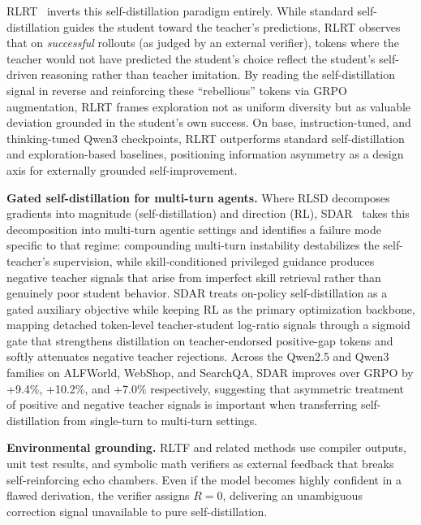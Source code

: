 \documentclass{article} %
\begin{document}
RLRT~\citep{2605.10781} inverts this self-distillation paradigm entirely. While standard self-distillation guides the student toward the teacher's predictions, RLRT observes that on \emph{successful} rollouts (as judged by an external verifier), tokens where the teacher would not have predicted the student's choice reflect the student's self-driven reasoning rather than teacher imitation. By reading the self-distillation signal in reverse and reinforcing these ``rebellious'' tokens via GRPO augmentation, RLRT frames exploration not as uniform diversity but as valuable deviation grounded in the student's own success. On base, instruction-tuned, and thinking-tuned Qwen3 checkpoints, RLRT outperforms standard self-distillation and exploration-based baselines, positioning information asymmetry as a design axis for externally grounded self-improvement.

\textbf{Gated self-distillation for multi-turn agents.} Where RLSD decomposes gradients into magnitude (self-distillation) and direction (RL), SDAR~\citep{2605.15155} takes this decomposition into multi-turn agentic settings and identifies a failure mode specific to that regime: compounding multi-turn instability destabilizes the self-teacher's supervision, while skill-conditioned privileged guidance produces negative teacher signals that arise from imperfect skill retrieval rather than genuinely poor student behavior. SDAR treats on-policy self-distillation as a gated auxiliary objective while keeping RL as the primary optimization backbone, mapping detached token-level teacher-student log-ratio signals through a sigmoid gate that strengthens distillation on teacher-endorsed positive-gap tokens and softly attenuates negative teacher rejections. Across the Qwen2.5 and Qwen3 families on ALFWorld, WebShop, and SearchQA, SDAR improves over GRPO by +9.4\%, +10.2\%, and +7.0\% respectively, suggesting that asymmetric treatment of positive and negative teacher signals is important when transferring self-distillation from single-turn to multi-turn settings.

\textbf{Environmental grounding.} RLTF and related methods use compiler outputs, unit test results, and symbolic math verifiers as external feedback that breaks self-reinforcing echo chambers. Even if the model becomes highly confident in a flawed derivation, the verifier assigns $R=0$, delivering an unambiguous correction signal unavailable to pure self-distillation.
\end{document}
